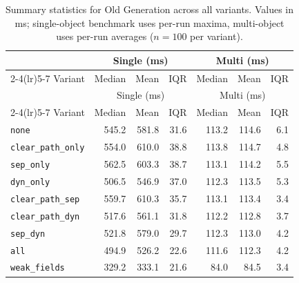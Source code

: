 \begin{longtable}[c]{l rrr rrr}
\caption[Old Generation summary statistics]{Summary statistics for Old Generation across all variants. Values in ms; single-object benchmark uses per-run maxima, multi-object uses per-run averages ($n=100$ per variant).}\label{tab:stats-oldgen} \\
\toprule
 & \multicolumn{3}{c}{Single (ms)} & \multicolumn{3}{c}{Multi (ms)} \\
\cmidrule(lr){2-4}\cmidrule(lr){5-7}
Variant & Median & Mean & IQR & Median & Mean & IQR \\
\midrule
\endfirsthead
\toprule
 & \multicolumn{3}{c}{Single (ms)} & \multicolumn{3}{c}{Multi (ms)} \\
\cmidrule(lr){2-4}\cmidrule(lr){5-7}
Variant & Median & Mean & IQR & Median & Mean & IQR \\
\midrule
\endhead
\bottomrule
\endfoot
\texttt{none} & 545.2 & 581.8 & 31.6 & 113.2 & 114.6 & 6.1 \\
\texttt{clear\_path\_only} & 554.0 & 610.0 & 38.8 & 113.8 & 114.7 & 4.8 \\
\texttt{sep\_only} & 562.5 & 603.3 & 38.7 & 113.1 & 114.2 & 5.5 \\
\texttt{dyn\_only} & 506.5 & 546.9 & 37.0 & 112.3 & 113.5 & 5.3 \\
\texttt{clear\_path\_sep} & 559.7 & 610.3 & 35.7 & 113.1 & 113.4 & 3.4 \\
\texttt{clear\_path\_dyn} & 517.6 & 561.1 & 31.8 & 112.2 & 112.8 & 3.7 \\
\texttt{sep\_dyn} & 521.8 & 579.0 & 29.7 & 112.3 & 113.0 & 4.2 \\
\texttt{all} & 494.9 & 526.2 & 22.6 & 111.6 & 112.3 & 4.2 \\
\texttt{weak\_fields} & 329.2 & 333.1 & 21.6 & 84.0 & 84.5 & 3.4 \\
\end{longtable}
